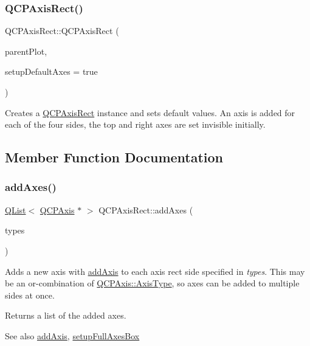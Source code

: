 \subsubsection{\texorpdfstring{Q\+C\+P\+Axis\+Rect()}{QCPAxisRect()}}
{\footnotesize\ttfamily Q\+C\+P\+Axis\+Rect\+::\+Q\+C\+P\+Axis\+Rect (\begin{DoxyParamCaption}\item[{\hyperlink{class_q_custom_plot}{Q\+Custom\+Plot} $\ast$}]{parent\+Plot,  }\item[{bool}]{setup\+Default\+Axes = {\ttfamily true} }\end{DoxyParamCaption})\hspace{0.3cm}{\ttfamily [explicit]}}

Creates a \hyperlink{class_q_c_p_axis_rect}{Q\+C\+P\+Axis\+Rect} instance and sets default values. An axis is added for each of the four sides, the top and right axes are set invisible initially. 

\subsection{Member Function Documentation}
\mbox{\label{class_q_c_p_axis_rect_a792e1f3d9cb1591fca135bb0de9b81fc}} 
\subsubsection{\texorpdfstring{add\+Axes()}{addAxes()}}
{\footnotesize\ttfamily \hyperlink{class_q_list}{Q\+List}$<$ \hyperlink{class_q_c_p_axis}{Q\+C\+P\+Axis} $\ast$ $>$ Q\+C\+P\+Axis\+Rect\+::add\+Axes (\begin{DoxyParamCaption}\item[{Q\+C\+P\+Axis\+::\+Axis\+Types}]{types }\end{DoxyParamCaption})}

Adds a new axis with \hyperlink{class_q_c_p_axis_rect_a2dc336092ccc57d44a46194c8a23e4f4}{add\+Axis} to each axis rect side specified in {\itshape types}. This may be an {\ttfamily or}-\/combination of \hyperlink{class_q_c_p_axis_ae2bcc1728b382f10f064612b368bc18a}{Q\+C\+P\+Axis\+::\+Axis\+Type}, so axes can be added to multiple sides at once.

Returns a list of the added axes.

\begin{DoxySeeAlso}{See also}
\hyperlink{class_q_c_p_axis_rect_a2dc336092ccc57d44a46194c8a23e4f4}{add\+Axis}, \hyperlink{class_q_c_p_axis_rect_a5fa906175447b14206954f77fc7f1ef4}{setup\+Full\+Axes\+Box} 
\end{DoxySeeAlso}
\mbox{\label{class_q_c_p_axis_rect_a2dc336092ccc57d44a46194c8a23e4f4}} 
